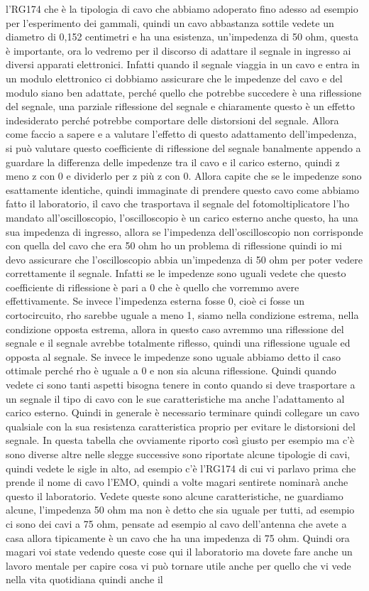 {l'RG174 che è la tipologia di cavo che abbiamo adoperato fino adesso ad esempio per l'esperimento dei gammali, quindi un cavo abbastanza sottile vedete un diametro di 0,152 centimetri e ha una esistenza, un'impedenza di 50 ohm, questa è importante, ora lo vedremo per il discorso di adattare il segnale in ingresso ai diversi apparati elettronici. Infatti quando il segnale viaggia in un cavo e entra in un modulo elettronico ci dobbiamo assicurare che le impedenze del cavo e del modulo siano ben adattate, perché quello che potrebbe succedere è una riflessione del segnale, una parziale riflessione del segnale e chiaramente questo è un effetto indesiderato perché potrebbe comportare delle distorsioni del segnale. Allora come faccio a sapere e a valutare l'effetto di questo adattamento dell'impedenza, si può valutare questo coefficiente di riflessione del segnale banalmente appendo a guardare la differenza delle impedenze tra il cavo e il carico esterno, quindi z meno z con 0 e dividerlo per z più z con 0. Allora capite che se le impedenze sono esattamente identiche, quindi immaginate di prendere questo cavo come abbiamo fatto il laboratorio, il cavo che trasportava il segnale del fotomoltiplicatore l'ho mandato all'oscilloscopio, l'oscilloscopio è un carico esterno anche questo, ha una sua impedenza di ingresso, allora se l'impedenza dell'oscilloscopio non corrisponde con quella del cavo che era 50 ohm ho un problema di riflessione quindi io mi devo assicurare che l'oscilloscopio abbia un'impedenza di 50 ohm per poter vedere correttamente il segnale. Infatti se le impedenze sono uguali vedete che questo coefficiente di riflessione è pari a 0 che è quello che vorremmo avere effettivamente. Se invece l'impedenza esterna fosse 0, cioè ci fosse un cortocircuito, rho sarebbe uguale a meno 1, siamo nella condizione estrema, nella condizione opposta estrema, allora in questo caso avremmo una riflessione del segnale e il segnale avrebbe totalmente riflesso, quindi una riflessione uguale ed opposta al segnale. Se invece le impedenze sono uguale abbiamo detto il caso ottimale perché rho è uguale a 0 e non sia alcuna riflessione. Quindi quando vedete ci sono tanti aspetti bisogna tenere in conto quando si deve trasportare a un segnale il tipo di cavo con le sue caratteristiche ma anche l'adattamento al carico esterno. Quindi in generale è necessario terminare quindi collegare un cavo qualsiale con la sua resistenza caratteristica proprio per evitare le distorsioni del segnale. In questa tabella che ovviamente riporto così giusto per esempio ma c'è sono diverse altre nelle slegge successive sono riportate alcune tipologie di cavi, quindi vedete le sigle in alto, ad esempio c'è l'RG174 di cui vi parlavo prima che prende il nome di cavo l'EMO, quindi a volte magari sentirete nominarà anche questo il laboratorio. Vedete queste sono alcune caratteristiche, ne guardiamo alcune, l'impedenza 50 ohm ma non è detto che sia uguale per tutti, ad esempio ci sono dei cavi a 75 ohm, pensate ad esempio al cavo dell'antenna che avete a casa allora tipicamente è un cavo che ha una impedenza di 75 ohm. Quindi ora magari voi state vedendo queste cose qui il laboratorio ma dovete fare anche un lavoro mentale per capire cosa vi può tornare utile anche per quello che vi vede nella vita quotidiana quindi anche il }
